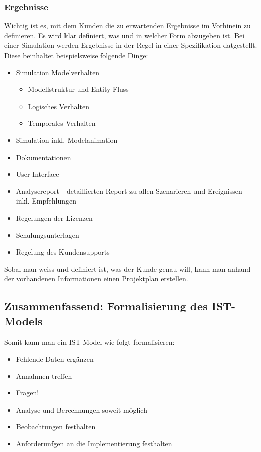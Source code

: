 \subsubsection{Ergebnisse}
Wichtig ist es, mit dem Kunden die zu erwartenden Ergebnisse im Vorhinein zu definieren. Es wird klar definiert, was und in welcher Form abzugeben ist. Bei einer Simulation werden Ergebnisse in der Regel in einer Spezifikation datgestellt. Diese beinhaltet beispielsweise folgende Dinge: 
\begin{itemize}
    \item Simulation Modelverhalten
    \begin{itemize}
        \item Modellstruktur und Entity-Fluss
        \item Logisches Verhalten
        \item Temporales Verhalten 
    \end{itemize}
    \item Simulation inkl. Modelanimation
    \item Dokumentationen
    \item User Interface
    \item Analysereport - detaillierten Report zu allen Szenarieren und Ereignissen inkl. Empfehlungen
    \item Regelungen der Lizenzen
    \item Schulungsunterlagen
    \item Regelung des Kundensupports
\end{itemize}
Sobal man weiss und definiert ist, was der Kunde genau will, kann man anhand der vorhandenen Informationen einen Projektplan erstellen.

\subsection{Zusammenfassend: Formalisierung des IST-Models}
Somit kann man ein IST-Model wie folgt formalisieren:
\begin{itemize}
    \item Fehlende Daten ergänzen
    \item Annahmen treffen
    \item Fragen!
    \item Analyse und Berechnungen soweit möglich
    \item Beobachtungen festhalten
    \item Anforderunfgen an die Implementierung festhalten
\end{itemize}

